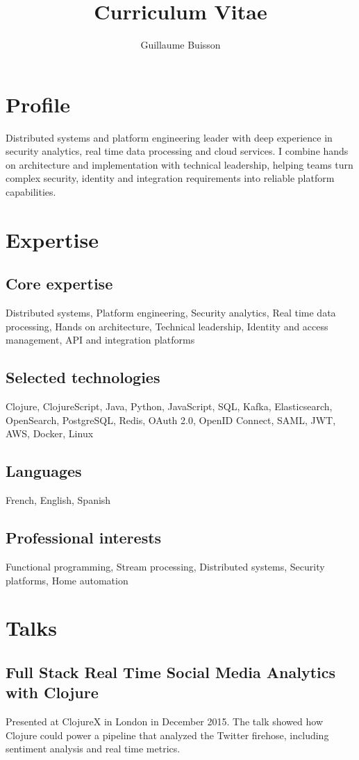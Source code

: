 \documentclass{article}
\title{Curriculum Vitae}
\author{Guillaume Buisson}
\date{}
\begin{document}
\maketitle
\section*{Profile}
Distributed systems and platform engineering leader with deep experience in security analytics, real time data processing and cloud services. I combine hands on architecture and implementation with technical leadership, helping teams turn complex security, identity and integration requirements into reliable platform capabilities.

\section*{Expertise}
\subsection*{Core expertise}
Distributed systems, Platform engineering, Security analytics, Real time data processing, Hands on architecture, Technical leadership, Identity and access management, API and integration platforms

\subsection*{Selected technologies}
Clojure, ClojureScript, Java, Python, JavaScript, SQL, Kafka, Elasticsearch, OpenSearch, PostgreSQL, Redis, OAuth 2.0, OpenID Connect, SAML, JWT, AWS, Docker, Linux

\subsection*{Languages}
French, English, Spanish

\subsection*{Professional interests}
Functional programming, Stream processing, Distributed systems, Security platforms, Home automation

\section*{Talks}
\subsection*{Full Stack Real Time Social Media Analytics with Clojure}
Presented at ClojureX in London in December 2015. The talk showed how Clojure could power a pipeline that analyzed the Twitter firehose, including sentiment analysis and real time metrics.
\end{document}
